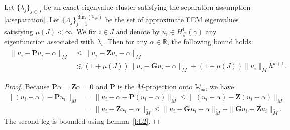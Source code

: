 \documentclass{siamart0516}
\newcommand{\bG}{\ensuremath{\boldsymbol G}}
\newcommand{\bP}{\ensuremath{\boldsymbol P}}
\newcommand{\bZ}{\ensuremath{\boldsymbol Z}}
\numberwithin{equation}{section}
\numberwithin{theorem}{section}
\numberwithin{figure}{section}
\begin{document}
\begin{theorem}\label{t:L2}
Let $\{\lambda_j\}_{j\in J}$ be an exact eigenvalue cluster satisfying the separation assumption \eqref{a:separation}. Let $\{\Lambda_{j}\}_{j=1}^{\dim (\mathbb{V}_\#)}$ be the set of approximate FEM eigenvalues satisfying $\mu(J)<\infty$.
We fix $i \in J$ and denote by $u_i \in H^1_\#(\gamma)$ any eigenfunction associated with $\lambda_i$.
Then for any $\alpha \in \mathbb{R}$, the following bound holds:
\begin{align}
\label{l2_bound}
\begin{aligned}
\|u_i - \bP u_i-\alpha\|_{\widetilde M} & \leq \|u_i - \bZ u_i-\alpha \|_{\widetilde M} 
\\ &\lesssim (1 +\mu(J))\|u_i-\bG u_i-\alpha\|_{\widetilde M}+ \left(1 +\mu(J)\right)\|u_i\|_{\widetilde M}h^{k+1}.
\end{aligned}
\end{align}
\end{theorem}

\begin{proof}
Because $\bP \alpha =\bZ \alpha=0$ and $\bP$ is the $\widetilde M$-projection onto $\mathbb{W}_\#$, we have 
$$
\begin{aligned}
\|(u_i-\alpha)-\bP u_i\|_{\widetilde M}& =\|u_i-\alpha-\bP(u_i-\alpha)\|_{\widetilde M} \le \|(u_i-\alpha)-\bZ (u_i-\alpha)\|_{\widetilde M}
\\ & =\|u_i-\bZ u_i -\alpha\|_{\widetilde M}  \leq \|u_i - \bG u_i-\alpha\|_{\widetilde M} + \|\bG u_i - \bZ u_i\|_{\widetilde M}.
\end{aligned}
$$
The second leg is bounded using Lemma~\ref{l:L2}.
\end{proof}

\end{document}
